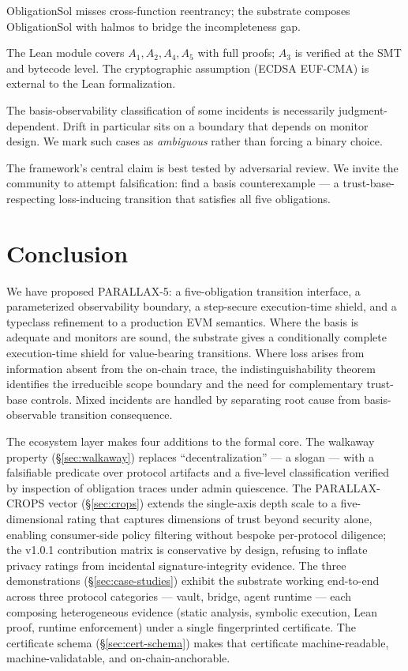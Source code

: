 \documentclass[11pt,a4paper]{article}
\begin{document}
ObligationSol misses cross-function reentrancy; the substrate composes ObligationSol with halmos to bridge the incompleteness gap.

The Lean module covers $A_1, A_2, A_4, A_5$ with full proofs; $A_3$ is verified at the SMT and bytecode level. The cryptographic assumption (ECDSA EUF-CMA) is external to the Lean formalization.

The basis-observability classification of some incidents is necessarily judgment-dependent. Drift in particular sits on a boundary that depends on monitor design. We mark such cases as \emph{ambiguous} rather than forcing a binary choice.

The framework's central claim is best tested by adversarial review. We invite the community to attempt falsification: find a basis counterexample — a trust-base-respecting loss-inducing transition that satisfies all five obligations.

\section{Conclusion}\label{sec:conclusion}

We have proposed PARALLAX-5: a five-obligation transition interface, a parameterized observability boundary, a step-secure execution-time shield, and a typeclass refinement to a production EVM semantics. Where the basis is adequate and monitors are sound, the substrate gives a conditionally complete execution-time shield for value-bearing transitions. Where loss arises from information absent from the on-chain trace, the indistinguishability theorem identifies the irreducible scope boundary and the need for complementary trust-base controls. Mixed incidents are handled by separating root cause from basis-observable transition consequence.

The ecosystem layer makes four additions to the formal core. The walkaway property (\S\ref{sec:walkaway}) replaces ``decentralization'' --- a slogan --- with a falsifiable predicate over protocol artifacts and a five-level classification verified by inspection of obligation traces under admin quiescence. The PARALLAX-CROPS vector (\S\ref{sec:crops}) extends the single-axis depth scale to a five-dimensional rating that captures dimensions of trust beyond security alone, enabling consumer-side policy filtering without bespoke per-protocol diligence; the v1.0.1 contribution matrix is conservative by design, refusing to inflate privacy ratings from incidental signature-integrity evidence. The three demonstrations (\S\ref{sec:case-studies}) exhibit the substrate working end-to-end across three protocol categories --- vault, bridge, agent runtime --- each composing heterogeneous evidence (static analysis, symbolic execution, Lean proof, runtime enforcement) under a single fingerprinted certificate. The certificate schema (\S\ref{sec:cert-schema}) makes that certificate machine-readable, machine-validatable, and on-chain-anchorable.
\end{document}
